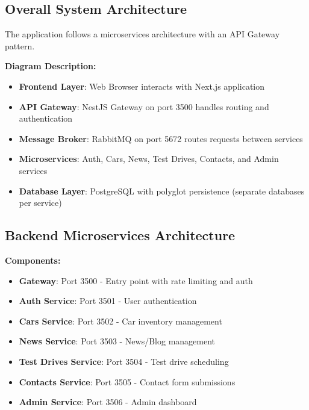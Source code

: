 \documentclass[12pt,a4paper]{article}
\begin{document}
\subsection{Overall System Architecture}

The application follows a microservices architecture with an API Gateway pattern.

\bigskip
\noindent\textbf{Diagram Description:}
\begin{itemize}
    \item \textbf{Frontend Layer}: Web Browser interacts with Next.js application
    \item \textbf{API Gateway}: NestJS Gateway on port 3500 handles routing and authentication
    \item \textbf{Message Broker}: RabbitMQ on port 5672 routes requests between services
    \item \textbf{Microservices}: Auth, Cars, News, Test Drives, Contacts, and Admin services
    \item \textbf{Database Layer}: PostgreSQL with polyglot persistence (separate databases per service)
\end{itemize}

\begin{figure}[h]
\centering
{}
\end{figure}

\subsection{Backend Microservices Architecture}

\bigskip
\noindent\textbf{Components:}
\begin{itemize}
    \item \textbf{Gateway}: Port 3500 - Entry point with rate limiting and auth
    \item \textbf{Auth Service}: Port 3501 - User authentication
    \item \textbf{Cars Service}: Port 3502 - Car inventory management
    \item \textbf{News Service}: Port 3503 - News/Blog management
    \item \textbf{Test Drives Service}: Port 3504 - Test drive scheduling
    \item \textbf{Contacts Service}: Port 3505 - Contact form submissions
    \item \textbf{Admin Service}: Port 3506 - Admin dashboard
\end{itemize}
\end{document}
